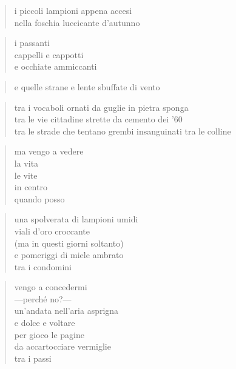 \begin{verse}
    i piccoli lampioni appena accesi\\
    nella foschia luccicante d'autunno
\end{verse}

\begin{verse}
    i passanti\\
    cappelli e cappotti\\
    e occhiate ammiccanti
\end{verse}

\begin{verse}
    e quelle strane e lente sbuffate di vento
\end{verse}

\begin{verse}
    tra i vocaboli ornati da guglie in pietra sponga\\
    tra le vie cittadine strette da cemento dei '60\\
    tra le strade che tentano grembi insanguinati tra le colline
\end{verse}

\begin{verse}
    ma vengo a vedere\\
    la vita\\
    le vite\\
    in centro\\
    quando posso
\end{verse}

\clearpage


\begin{verse}
    una spolverata di lampioni umidi\\
    viali d'oro croccante\\
    (ma in questi giorni soltanto)\\
    e pomeriggi di miele ambrato\\
    tra i condomini
\end{verse}

\clearpage


\begin{verse}
    vengo a concedermi\\
    —perché no?—\\
    un'andata nell'aria asprigna\\
    e dolce e voltare\\
    per gioco le pagine\\
    da accartocciare vermiglie\\
    tra i passi
\end{verse}


